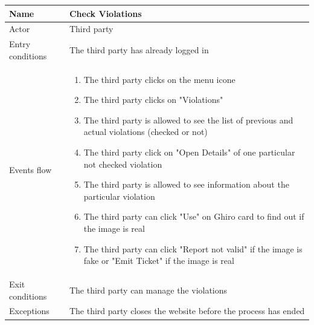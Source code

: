 \documentclass{article}
\begin{document}
\begin{table}[H]
    \begin{tabular}{|l|l|}
    \hline
    Name & \begin{minipage}[t]{0.7\textwidth}\textbf{Check Violations} \end{minipage} \\ \hline  
    Actor & \begin{minipage}[t]{0.7\textwidth} Third party \end{minipage} \\ \hline 
    Entry conditions & \begin{minipage}[t]{0.7\textwidth} The third party has already logged in \end{minipage} \\
    \hline 
    Events flow & \begin{minipage}[t]{0.7\textwidth}
    \begin{enumerate}
        \item The third party clicks on the menu icone
        \item The third party clicks on "Violations"
        \item The third party is allowed to see the list of previous and
        actual violations (checked or not)
        \item The third party click on "Open Details" of one particular not
        checked violation
        \item The third party is allowed to see information about the particular
        violation
        \item The third party can click "Use" on Ghiro card to find out if the
        image is real
        \item The third party can click "Report not valid" if the image is fake
        or "Emit Ticket" if the image is real
    \end{enumerate}
    \end{minipage} \\ \hline
    Exit conditions & \begin{minipage}[t]{0.7\textwidth} The third party can manage the violations \end{minipage} \\
    \hline
    Exceptions & \begin{minipage}[t]{0.7\textwidth}The third party closes the
    website before the process has ended \end{minipage} \\ \hline
    \end{tabular}
\end{table}
\end{document}
